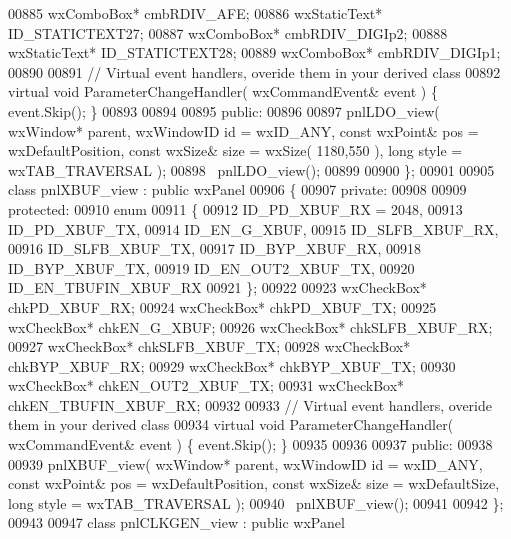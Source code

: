 \begin{DoxyCode}
00885         wxComboBox* cmbRDIV_AFE;
00886         wxStaticText* ID_STATICTEXT27;
00887         wxComboBox* cmbRDIV_DIGIp2;
00888         wxStaticText* ID_STATICTEXT28;
00889         wxComboBox* cmbRDIV_DIGIp1;
00890         
00891         \textcolor{comment}{// Virtual event handlers, overide them in your derived class}
00892         \textcolor{keyword}{virtual} \textcolor{keywordtype}{void} ParameterChangeHandler( wxCommandEvent& event ) \{ \textcolor{keyword}{event}.Skip(); \}
00893         
00894     
00895     \textcolor{keyword}{public}:
00896         
00897         pnlLDO_view( wxWindow* parent, wxWindowID \textcolor{keywordtype}{id} = wxID\_ANY, \textcolor{keyword}{const} wxPoint& pos = wxDefaultPosition, \textcolor{keyword}{
      const} wxSize& size = wxSize( 1180,550 ), \textcolor{keywordtype}{long} style = wxTAB\_TRAVERSAL ); 
00898         ~pnlLDO_view();
00899     
00900 \};
00901 
00905 \textcolor{keyword}{class }pnlXBUF_view : \textcolor{keyword}{public} wxPanel 
00906 \{
00907     \textcolor{keyword}{private}:
00908     
00909     \textcolor{keyword}{protected}:
00910         \textcolor{keyword}{enum}
00911         \{
00912             ID\_PD\_XBUF\_RX = 2048,
00913             ID_PD_XBUF_TX,
00914             ID_EN_G_XBUF,
00915             ID_SLFB_XBUF_RX,
00916             ID_SLFB_XBUF_TX,
00917             ID_BYP_XBUF_RX,
00918             ID_BYP_XBUF_TX,
00919             ID_EN_OUT2_XBUF_TX,
00920             ID\_EN\_TBUFIN\_XBUF\_RX
00921         \};
00922         
00923         wxCheckBox* chkPD_XBUF_RX;
00924         wxCheckBox* chkPD_XBUF_TX;
00925         wxCheckBox* chkEN_G_XBUF;
00926         wxCheckBox* chkSLFB_XBUF_RX;
00927         wxCheckBox* chkSLFB_XBUF_TX;
00928         wxCheckBox* chkBYP_XBUF_RX;
00929         wxCheckBox* chkBYP_XBUF_TX;
00930         wxCheckBox* chkEN_OUT2_XBUF_TX;
00931         wxCheckBox* chkEN_TBUFIN_XBUF_RX;
00932         
00933         \textcolor{comment}{// Virtual event handlers, overide them in your derived class}
00934         \textcolor{keyword}{virtual} \textcolor{keywordtype}{void} ParameterChangeHandler( wxCommandEvent& event ) \{ \textcolor{keyword}{event}.Skip(); \}
00935         
00936     
00937     \textcolor{keyword}{public}:
00938         
00939         pnlXBUF_view( wxWindow* parent, wxWindowID \textcolor{keywordtype}{id} = wxID\_ANY, \textcolor{keyword}{const} wxPoint& pos = wxDefaultPosition, \textcolor{keyword}{
      const} wxSize& size = wxDefaultSize, \textcolor{keywordtype}{long} style = wxTAB\_TRAVERSAL ); 
00940         ~pnlXBUF_view();
00941     
00942 \};
00943 
00947 \textcolor{keyword}{class }pnlCLKGEN_view : \textcolor{keyword}{public} wxPanel 

\end{DoxyCode}
